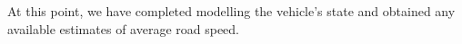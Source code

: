 At this point, we have completed modelling the vehicle's state and obtained any available estimates of average road speed.




